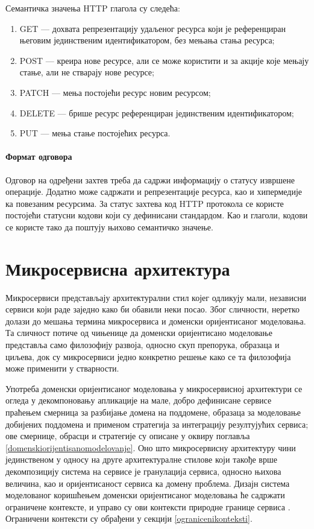 \documentclass[12pt,oneside]{memoir}
\begin{document}
Семантичка значења HTTP глагола су следећа:
\begin{enumerate}
\item GET --- дохвата репрезентацију удаљеног ресурса који је референциран његовим јединственим идентификатором, без мењања стања ресурса;
\item POST --- креира нове ресурсе, али се може користити и за акције које мењају стање, али не стварају нове ресурсе;
\item PATCH --- мења постојећи ресурс новим ресурсом;
\item DELETE --- брише ресурс референциран јединственим идентификатором;
\item PUT --- мења стање постојећих ресурса.
\end{enumerate}

\subsubsection{Формат одговора}
Одговор на одређени захтев треба да садржи информацију о статусу извршене операције. Додатно може садржати и репрезентације ресурса, као и хипермедије ка повезаним ресурсима. За статус захтева код HTTP протокола се користе постојећи статусни кодови који су дефинисани стандардом. Као и глаголи, кодови се користе тако да поштују њихово семантичко значење.

\chapter{Микросервисна архитектура}\label{mikroservisi}
Микросервиси представљају архитектурални стил којег одликују мали, независни сервиси који раде заједно како би обавили неки посао. Због сличности, неретко долази до мешања термина микросервиса и доменски оријентисаног моделовања. Та сличност потиче од чињенице да доменски оријентисано моделовање представља само филозофију развоја, односно скуп препорука, образаца и циљева, док су микросервиси једно конкретно решење како се та филозофија може применити у стварности.

Употреба доменски оријентисаног моделовања у микросервисној архитектури се огледа у декомпоновању апликације на мале, добро дефинисане сервисе праћењем смерница за разбијање домена на поддомене, образаца за моделовање добијених поддомена и применом стратегија за интеграцију резултујућих сервиса; ове смернице, обрасци и стратегије су описане у оквиру поглавља \ref{domenskiorijentisanomodelovanje}. Оно што микросервисну архитектуру чини јединственом у односу на друге архитектуралне стилове који такође врше декомпозицију система на сервисе је гранулација сервиса, односно њихова величина, као и оријентисаност сервиса ка домену проблема. Дизајн система моделованог коришћењем доменски оријентисаног моделовања ће садржати ограничене контексте, и управо су ови контексти природне границе сервиса \cite{netmicroservices}. Ограничени контексти су обрађени у секцији \ref{ogranicenikonteksti}.
\end{document}
